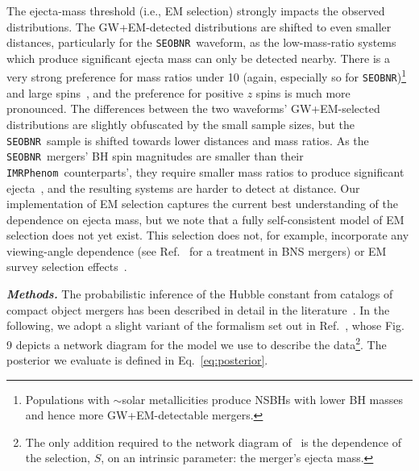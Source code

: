 \documentclass[%
 reprint,
 superscriptaddress,
 nofootinbib,
 amsmath,amssymb,
 aps,
]{revtex4-2}
\newcommand{\seobnr}{\texttt{SEOBNR}}
\newcommand{\imrp}{\texttt{IMRPhenom}}
\begin{document}
The ejecta-mass threshold (i.e., EM selection) strongly impacts the observed distributions. The GW+EM-detected distributions are shifted to even smaller distances, particularly for the \seobnr\ waveform, as the low-mass-ratio systems which produce significant ejecta mass can only be detected nearby. There is a very strong preference for mass ratios under 10 (again, especially so for \seobnr)\footnote{Populations with $\sim$solar metallicities produce NSBHs with lower BH masses~\cite{Kruckow_etal:2018} and hence more GW+EM-detectable mergers.} and large spins~\cite{Foucart:2012,Foucart_etal:2018}, and the preference for positive $z$ spins is much more pronounced. The differences between the two waveforms' GW+EM-selected distributions are slightly obfuscated by the small sample sizes, but the \seobnr\ sample is shifted towards lower distances and mass ratios. As the \seobnr\ mergers' BH spin magnitudes are smaller than their \imrp\ counterparts', they require smaller mass ratios to produce significant ejecta~\cite{Foucart_etal:2018}, and the resulting systems are harder to detect at distance. Our implementation of EM selection captures the current best understanding of the dependence on ejecta mass, but we note that a fully self-consistent model of EM selection does not yet exist. This selection does not, for example, incorporate any viewing-angle dependence (see Ref.~\cite{Chen:2020} for a treatment in BNS mergers) or EM survey selection effects~\cite[e.g.,][]{Rosswog_etal:2017,Scolnic_etal:2018,Cowperthwaite_etal:2019,Setzer_etal:2019}.


\textbf{\emph{Methods.}} The probabilistic inference of the Hubble constant from catalogs of compact object mergers has been described in detail in the literature~\cite{Schutz:1986,Dalal:2006,Nissanke_etal:2010,Taylor_etal:2012,Nissanke_etal:2013,Abbott_etal:2017a,Chen_etal:2018,Fishbach_etal:2018,Feeney_etal:2018,Mandel_etal:2018,Gray_etal:2019,Mortlock_etal:2019,Vitale_etal:2020}. In the following, we adopt a slight variant of the formalism set out in Ref.~\cite{Mortlock_etal:2019}, whose Fig. 9 depicts a network diagram for the model we use to describe the data\footnote{The only addition required to the network diagram of~\cite{Mortlock_etal:2019} is the dependence of the selection, $S$, on an intrinsic parameter: the merger's ejecta mass.}. The posterior we evaluate is defined in Eq.~\ref{eq:posterior}.
\end{document}
